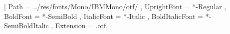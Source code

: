 \setmonofont{IBMPlexMono}
[
	Path = ../res/fonts/Mono/IBMMono/otf/ ,
	UprightFont = *-Regular ,
	BoldFont = *-SemiBold ,
	ItalicFont = *-Italic ,
	BoldItalicFont = *-SemiBoldItalic ,
	Extension = .otf,
]